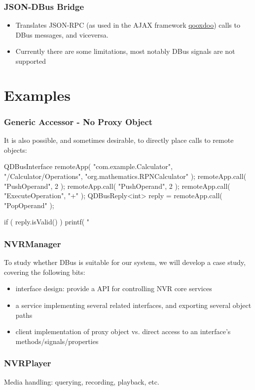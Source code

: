 \documentclass[xcolor=dvipsnames,compress]{beamer}
\begin{document}
\begin{frame}
    \frametitle{JSON-DBus Bridge}
    \begin{itemize}
    \item Translates JSON-RPC (as used in the AJAX framework \href{http://manual.qooxdoo.org/1.6/pages/communication/rpc.html}{qooxdoo}) 
    calls to DBus messages, and viceversa.
    \item Currently there are some limitations, most notably DBus signals are not supported
    \end{itemize}
\end{frame}

\section[ex]{Examples}

\begin{frame}[fragile]
    \frametitle{Generic Accessor - No Proxy Object}
    It is  also possible, and sometimes desirable, to directly place calls to remote objects:
    \begin{cppcode}
        QDBusInterface remoteApp( "com.example.Calculator", "/Calculator/Operations",
                               "org.mathematics.RPNCalculator" );
        remoteApp.call( "PushOperand", 2 );
        remoteApp.call( "PushOperand", 2 );
        remoteApp.call( "ExecuteOperation", "+" );
        QDBusReply<int> reply = remoteApp.call( "PopOperand" );

        if ( reply.isValid() )
            printf( "%
    \end{cppcode}

\end{frame}

\begin{frame}
    \frametitle{NVRManager}
    To study whether DBus is suitable for our system, we will develop a case study, covering the following bits:
    \begin{itemize}
    \item interface design: provide a  API for controlling NVR core services     
    \item a service implementing several related interfaces, and exporting several object paths
    \item client implementation of proxy object vs. direct access to an interface's methods/signals/properties
    \end{itemize}
\end{frame}

\begin{frame}
    \frametitle{NVRPlayer}
    Media handling: querying, recording, playback, etc.
\end{frame}
\end{document}
